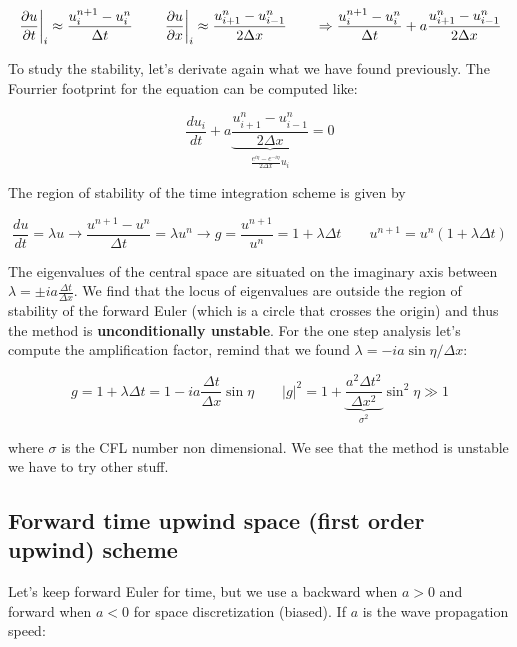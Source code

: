 \begin{equation}
\left. \frac{\partial u}{\partial t}\right|_i \approx \frac{u_i^{n+1} - u_i^n}{\Delta t} \qquad \left. \frac{\partial u}{\partial x}\right|_i \approx \frac{u_{i+1}^{n} - u_{i-1}^n}{2\Delta x} \qquad \Rightarrow \frac{u_i ^{n+1} - u_i^n}{\Delta t} + a \frac{u_{i+1}^{n} - u_{i-1}^n}{2\Delta x}
\end{equation}

To study the stability, let's derivate again what we have found previously. The Fourrier footprint for the equation can be computed like:

\begin{equation}
\frac{d u_i}{dt} + a \underbrace{\frac{u_{i+1}^n - u_{i-1}^n}{2\Delta x}}_{\frac{e^{i\eta} - e^{-i\eta}}{2\Delta x}u_i} = 0 
\end{equation}

The region of stability of the time integration scheme is given by 

\begin{equation}
\frac{du}{dt} = \lambda u \rightarrow \frac{u^{n+1}-u^n}{\Delta t} = \lambda u^n \rightarrow g = \frac{u^{n+1}}{u^n} = 1+\lambda \Delta t \qquad u^{n+1} = u^n (1+\lambda \Delta t)
\end{equation}

The eigenvalues of the central space are situated on the imaginary axis between $\lambda = \pm ia \frac{\Delta t}{\Delta x}$. We find that the locus of eigenvalues are outside the region of stability of the forward Euler (which is a circle that crosses the origin) and thus the method is \textbf{unconditionally unstable}. For the one step analysis let's compute the amplification factor, remind that we found $\lambda = -ia\sin \eta /\Delta x$: 

\begin{equation}
g = 1+ \lambda \Delta t = 1 - i a\frac{\Delta t}{\Delta x} \sin \eta \qquad |g|^2 = 1+ \underbrace{\frac{a^2 \Delta t^2}{\Delta x^2}}_{\sigma^2} \sin^2 \eta \gg 1
\end{equation}

where $\sigma$ is the CFL number non dimensional. We see that the method is unstable we have to try other stuff. 

\subsection{Forward time upwind space (first order upwind) scheme}
Let's keep forward Euler for time, but we use a backward when $a>0$ and forward when $a<0$ for space discretization (biased). If $a$ is the wave propagation speed: 

